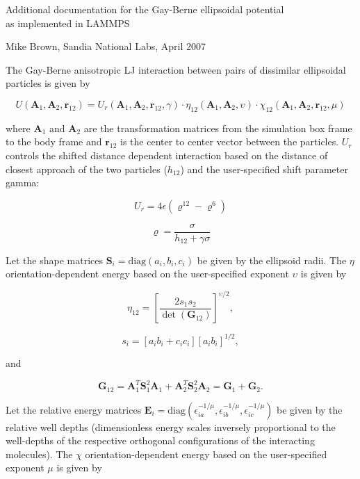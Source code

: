 


\begin{center}

\large{Additional documentation for the Gay-Berne ellipsoidal potential \\
  as implemented in LAMMPS}

\end{center}

\centerline{Mike Brown, Sandia National Labs, April 2007}

\vspace{0.3in}

The Gay-Berne anisotropic LJ interaction between pairs of dissimilar
ellipsoidal particles is given by

$$ U ( \mathbf{A}_1, \mathbf{A}_2, \mathbf{r}_{12} ) = U_r (
\mathbf{A}_1, \mathbf{A}_2, \mathbf{r}_{12}, \gamma ) \cdot \eta_{12} (
\mathbf{A}_1, \mathbf{A}_2, \upsilon ) \cdot \chi_{12} ( \mathbf{A}_1,
\mathbf{A}_2, \mathbf{r}_{12}, \mu ) $$

where $\mathbf{A}_1$ and $\mathbf{A}_2$ are the transformation
matrices from the simulation box frame to the body frame and
$\mathbf{r}_{12}$ is the center to center vector between the
particles.  $U_r$ controls the shifted distance dependent interaction
based on the distance of closest approach of the two particles
($h_{12}$) and the user-specified shift parameter gamma:

$$ U_r = 4 \epsilon ( \varrho^{12} - \varrho^6) $$

$$ \varrho = \frac{\sigma}{ h_{12} + \gamma \sigma} $$

Let the shape matrices $\mathbf{S}_i=\mbox{diag}(a_i, b_i, c_i)$ be 
given by the ellipsoid radii. The $\eta$ orientation-dependent energy 
based on the user-specified exponent $\upsilon$ is given by

$$ \eta_{12} = [ \frac{ 2 s_1 s_2 }{\det ( \mathbf{G}_{12} )}]^{
\upsilon / 2 } , $$

$$ s_i = [a_i b_i + c_i c_i][a_i b_i]^{ 1 / 2 }, $$

and

$$ \mathbf{G}_{12} = \mathbf{A}_1^T \mathbf{S}_1^2 \mathbf{A}_1 +
\mathbf{A}_2^T \mathbf{S}_2^2 \mathbf{A}_2 = \mathbf{G}_1 +
\mathbf{G}_2. $$

Let the relative energy matrices $\mathbf{E}_i = \mbox{diag}
(\epsilon_{ia}^{-1/\mu}, \epsilon_{ib}^{-1/\mu}, \epsilon_{ic}^{-1/\mu})$
be given by the relative well depths (dimensionless energy scales 
inversely proportional to the well-depths of the respective 
orthogonal configurations of the interacting molecules). The 
$\chi$ orientation-dependent energy based on the user-specified 
exponent $\mu$ is given by

